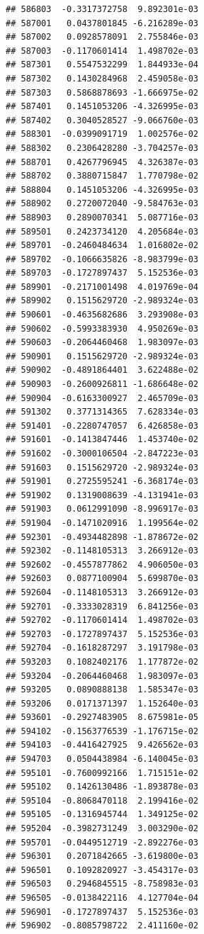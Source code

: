 \begin{frame}[fragile]
\begin{verbatim}
## 586803  -0.3317372758  9.892301e-03
## 587001   0.0437801845 -6.216289e-03
## 587002   0.0928578091  2.755846e-03
## 587003  -0.1170601414  1.498702e-03
## 587301   0.5547532299  1.844933e-04
## 587302   0.1430284968  2.459058e-03
## 587303   0.5868878693 -1.666975e-02
## 587401   0.1451053206 -4.326995e-03
## 587402   0.3040528527 -9.066760e-03
## 588301  -0.0399091719  1.002576e-02
## 588302   0.2306428280 -3.704257e-03
## 588701   0.4267796945  4.326387e-03
## 588702   0.3880715847  1.770798e-02
## 588804   0.1451053206 -4.326995e-03
## 588902   0.2720072040 -9.584763e-03
## 588903   0.2890070341  5.087716e-03
## 589501   0.2423734120  4.205684e-03
## 589701  -0.2460484634  1.016802e-02
## 589702  -0.1066635826 -8.983799e-03
## 589703  -0.1727897437  5.152536e-03
## 589901  -0.2171001498  4.019769e-04
## 589902   0.1515629720 -2.989324e-03
## 590601  -0.4635682686  3.293908e-03
## 590602  -0.5993383930  4.950269e-03
## 590603  -0.2064460468  1.983097e-03
## 590901   0.1515629720 -2.989324e-03
## 590902  -0.4891864401  3.622488e-02
## 590903  -0.2600926811 -1.686648e-02
## 590904  -0.6163300927  2.465709e-03
## 591302   0.3771314365  7.628334e-03
## 591401  -0.2280747057  6.426858e-03
## 591601  -0.1413847446  1.453740e-02
## 591602  -0.3000106504 -2.847223e-03
## 591603   0.1515629720 -2.989324e-03
## 591901   0.2725595241 -6.368174e-03
## 591902   0.1319008639 -4.131941e-03
## 591903   0.0612991090 -8.996917e-03
## 591904  -0.1471020916  1.199564e-02
## 592301  -0.4934482898 -1.878672e-02
## 592302  -0.1148105313  3.266912e-03
## 592602  -0.4557877862  4.906050e-03
## 592603   0.0877100904  5.699870e-03
## 592604  -0.1148105313  3.266912e-03
## 592701  -0.3333028319  6.841256e-03
## 592702  -0.1170601414  1.498702e-03
## 592703  -0.1727897437  5.152536e-03
## 592704  -0.1618287297  3.191798e-03
## 593203   0.1082402176  1.177872e-02
## 593204  -0.2064460468  1.983097e-03
## 593205   0.0890888138  1.585347e-03
## 593206   0.0171371397  1.152640e-03
## 593601  -0.2927483905  8.675981e-05
## 594102  -0.1563776539 -1.176715e-02
## 594103  -0.4416427925  9.426562e-03
## 594703   0.0504438984 -6.140045e-03
## 595101  -0.7600992166  1.715151e-02
## 595102   0.1426130486 -1.893878e-03
## 595104  -0.8068470118  2.199416e-02
## 595105  -0.1316945744  1.349125e-02
## 595204  -0.3982731249  3.003290e-02
## 595701  -0.0449512719 -2.892276e-03
## 596301   0.2071842665 -3.619800e-03
## 596501   0.1092820927 -3.454317e-03
## 596503   0.2946845515 -8.758983e-03
## 596505  -0.0138422116  4.127704e-04
## 596901  -0.1727897437  5.152536e-03
## 596902  -0.8085798722  2.411160e-02

\end{verbatim}
\end{frame}
